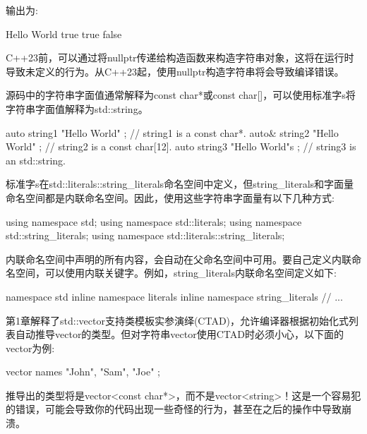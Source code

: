 输出为:

\begin{shell}
Hello World
true
true
false
\end{shell}


C++23前，可以通过将nullptr传递给构造函数来构造字符串对象，这将在运行时导致未定义的行为。从C++23起，使用nullptr构造字符串将会导致编译错误。


源码中的字符串字面值通常解释为const char*或const char[]，可以使用标准字s将字符串字面值解释为std::string。

\begin{cpp}
auto string1 { "Hello World" }; // string1 is a const char*.
auto& string2 { "Hello World" }; // string2 is a const char[12].
auto string3 { "Hello World"s }; // string3 is an std::string.
\end{cpp}

标准字s在std::literals::string\_literals命名空间中定义，但string\_literals和字面量命名空间都是内联命名空间。因此，使用这些字符串字面量有以下几种方式:

\begin{cpp}
using namespace std;
using namespace std::literals;
using namespace std::string_literals;
using namespace std::literals::string_literals;
\end{cpp}

内联命名空间中声明的所有内容，会自动在父命名空间中可用。要自己定义内联命名空间，可以使用内联关键字。例如，string\_literals内联命名空间定义如下:

\begin{cpp}
namespace std {
    inline namespace literals {
        inline namespace string_literals {
            // ...
        }
    }
}
\end{cpp}


第1章解释了std::vector支持类模板实参演绎(CTAD)，允许编译器根据初始化式列表自动推导vector的类型。但对字符串vector使用CTAD时必须小心，以下面的vector为例:

\begin{cpp}
vector names { "John", "Sam", "Joe" };
\end{cpp}

推导出的类型将是vector<const char*>，而不是vector<string>！这是一个容易犯的错误，可能会导致你的代码出现一些奇怪的行为，甚至在之后的操作中导致崩溃。

